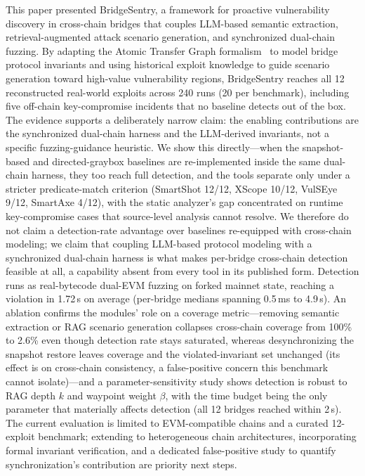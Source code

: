 \documentclass[journal]{IEEEtran}
\begin{document}
This paper presented BridgeSentry, a framework for proactive vulnerability discovery in cross-chain bridges that couples LLM-based semantic extraction, retrieval-augmented attack scenario generation, and synchronized dual-chain fuzzing. By adapting the Atomic Transfer Graph formalism~\cite{dubler2025atg} to model bridge protocol invariants and using historical exploit knowledge to guide scenario generation toward high-value vulnerability regions, BridgeSentry reaches all 12 reconstructed real-world exploits across 240 runs (20 per benchmark), including five off-chain key-compromise incidents that no baseline detects out of the box. The evidence supports a deliberately narrow claim: the enabling contributions are the synchronized dual-chain harness and the LLM-derived invariants, not a specific fuzzing-guidance heuristic. We show this directly---when the snapshot-based and directed-graybox baselines are re-implemented inside the same dual-chain harness, they too reach full detection, and the tools separate only under a stricter predicate-match criterion (SmartShot 12/12, XScope 10/12, VulSEye 9/12, SmartAxe 4/12), with the static analyzer's gap concentrated on runtime key-compromise cases that source-level analysis cannot resolve. We therefore do not claim a detection-rate advantage over baselines re-equipped with cross-chain modeling; we claim that coupling LLM-based protocol modeling with a synchronized dual-chain harness is what makes per-bridge cross-chain detection feasible at all, a capability absent from every tool in its published form. Detection runs as real-bytecode dual-EVM fuzzing on forked mainnet state, reaching a violation in 1.72\,s on average (per-bridge medians spanning 0.5\,ms to 4.9\,s). An ablation confirms the modules' role on a coverage metric---removing semantic extraction or RAG scenario generation collapses cross-chain coverage from 100\% to 2.6\% even though detection rate stays saturated, whereas desynchronizing the snapshot restore leaves coverage and the violated-invariant set unchanged (its effect is on cross-chain consistency, a false-positive concern this benchmark cannot isolate)---and a parameter-sensitivity study shows detection is robust to RAG depth $k$ and waypoint weight $\beta$, with the time budget being the only parameter that materially affects detection (all 12 bridges reached within 2\,s). The current evaluation is limited to EVM-compatible chains and a curated 12-exploit benchmark; extending to heterogeneous chain architectures, incorporating formal invariant verification, and a dedicated false-positive study to quantify synchronization's contribution are priority next steps.
\end{document}
